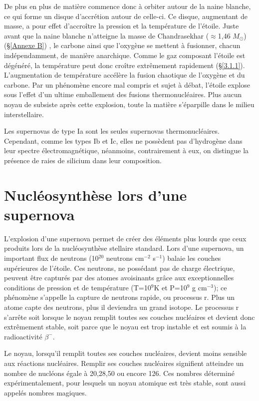 De plus en plus de matière commence donc à orbiter autour de la naine blanche, ce qui forme un disque d'accrétion autour de celle-ci. Ce disque, augmentant de masse, a pour effet d'accroître la pression et la température de l'étoile. Juste avant que la naine blanche n'atteigne la masse de Chandrasekhar ($\approx$1,46 $M_\odot$)(§\ref{Annexe B}) 
 , le carbone ainsi que l'oxygène se mettent à fusionner, chacun indépendamment, de manière anarchique. Comme le gaz composant l'étoile est dégénéré, la température peut donc croître extrêmement rapidement (§\ref{3.1.1}). L'augmentation de température accélère la fusion chaotique de l'oxygène et du carbone. Par un phénomène encore mal compris et sujet à débat, l'étoile explose sous l'effet d'un ultime emballement des fusions thermonucléaires. Plus aucun noyau de subsiste après cette explosion, toute la matière s'éparpille dans le milieu interstellaire.\smallskip
 
 Les supernovas de type Ia sont les seules supernovas thermonucléaires. Cependant, comme les types Ib et Ic, elles ne possèdent pas d'hydrogène dans leur spectre électromagnétique, néanmoins, contrairement à eux, on distingue la présence de raies de silicium dans leur composition. 
 
 \section{Nucléosynthèse lors d'une supernova}\label{3.2} 
 
 L'explosion d'une supernova permet de créer des éléments plus lourds que ceux produits lors de la nucléosynthèse stellaire standard. Lors d'une supernova, un important flux de neutrons (10$^{20}$ neutrons cm$^{-2}$ s$^{-1}$) balaie les couches supérieures de l'étoile. Ces neutrons, ne possédant pas de charge électrique, peuvent être capturés par des atomes avoisinants grâce aux exceptionnelles conditions de pression et de température (T=10$^{9}$K et P=10$^{9}$ g cm$^{-3}$); ce phénomène s'appelle la capture de neutrons rapide, ou processus r\footnotemark[2]. 
 Plus un atome capte des neutrons, plus il deviendra un grand isotope. Le processus r s'arrête soit lorsque le noyau remplit toutes ses couches nucléaires et devient donc extrêmement stable, soit parce que le noyau est trop instable et est soumis à la radioactivité $\beta^{-}$.\smallskip
 
 Le noyau, lorsqu'il remplit toutes ses couches nucléaires, devient moins sensible aux réactions nucléaires. Remplir ses couches nucléaires signifient atteindre un nombre de nucléons égale à 20,28,50 ou encore 126. Ces nombres déterminé expérimentalement, pour lesquels un noyau atomique est très stable, sont aussi appelés nombres magiques.\smallskip 
 
